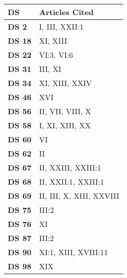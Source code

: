 
\begin{xltabular}{\linewidth}{ l | X }
    \hline

    \textbf{\normalsize DS} & \textbf{\normalsize Articles Cited}  \\
    \endfirsthead
    \hline \hline

    \textbf {DS 2} & I, III, XXII:1 \\ \hline

    \textbf {DS 18} & XI, XIII \\ \hline

    \textbf {DS 22} & VI:3, VI:6 \\ \hline

    \textbf {DS 31} & III, XI \\ \hline

    \textbf {DS 34} & XI, XIII, XXIV \\ \hline

    \textbf {DS 46} & XVI \\ \hline

    \textbf {DS 56} & II, VII, VIII, X \\ \hline

    \textbf {DS 58} & I, XI, XIII, XX \\ \hline

    \textbf {DS 60} & VI \\ \hline

    \textbf {DS 62} & II \\ \hline

    \textbf {DS 67} & II, XXIII, XXIII:1 \\ \hline

    \textbf {DS 68} & II, XXII:1, XXIII:1 \\ \hline

    \textbf {DS 69} & II, III, X, XIII, XXVIII \\ \hline

    \textbf {DS 75} & III:2 \\ \hline

    \textbf {DS 76} & XI \\ \hline

    \textbf {DS 87} & III:2 \\ \hline

    \textbf {DS 90} & XI:1, XIII, XVIII:11 \\ \hline

    \textbf {DS 98} & XIX \\ \hline


\end{xltabular}
